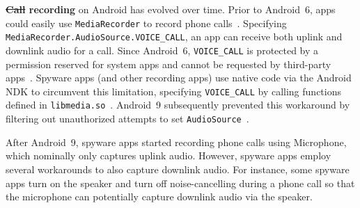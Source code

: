 \documentclass[sigconf,balance=false]{acmart}
\newcommand{\alex}[1]{\textcolor{chicagomaroon}{\noindent[AL: #1]}}
\newcommand{\geoff}[1]{\textcolor{purple}{\noindent[GV: #1]}}
\newcommand{\alex}[1]{}
\newcommand{\geoff}[1]{}
\providecommand{\DIFadd}[1]{{\protect\color{blue}\uwave{#1}}} %
\providecommand{\DIFdel}[1]{{\protect\color{red}\sout{#1}}}                      %
\providecommand{\DIFaddbegin}{} %
\providecommand{\DIFaddend}{} %
\providecommand{\DIFdelbegin}{} %
\providecommand{\DIFdelend}{} %
\newcommand{\DIFscaledelfig}{0.5}
\newlength{\DIFdelgraphicswidth} %
\newlength{\DIFdelgraphicsheight} %
\newcommand{\DIFaddincludegraphics}[2][]{{\color{blue}\fbox{\DIFOincludegraphics[#1]{#2}}}} %
\newcommand{\DIFdelincludegraphics}[2][]{%
\sbox{\DIFdelgraphicsbox}{\DIFOincludegraphics[#1]{#2}}%
\settoboxwidth{\DIFdelgraphicswidth}{\DIFdelgraphicsbox} %
\settoboxtotalheight{\DIFdelgraphicsheight}{\DIFdelgraphicsbox} %
\scalebox{\DIFscaledelfig}{%
\parbox[b]{\DIFdelgraphicswidth}{\usebox{\DIFdelgraphicsbox}\\[-\baselineskip] \rule{\DIFdelgraphicswidth}{0em}}\llap{\resizebox{\DIFdelgraphicswidth}{\DIFdelgraphicsheight}{%
\setlength{\unitlength}{\DIFdelgraphicswidth}%
\begin{picture}(1,1)%
\thicklines\linethickness{2pt} %
{\color[rgb]{1,0,0}\put(0,0){\framebox(1,1){}}}%
{\color[rgb]{1,0,0}\put(0,0){\line( 1,1){1}}}%
{\color[rgb]{1,0,0}\put(0,1){\line(1,-1){1}}}%
\end{picture}%
}\hspace*{3pt}}} %
} %
\DeclareRobustCommand{\DIFaddbegin}{\DIFOaddbegin \let\includegraphics\DIFaddincludegraphics} %
\DeclareRobustCommand{\DIFaddend}{\DIFOaddend \let\includegraphics\DIFOincludegraphics} %
\DeclareRobustCommand{\DIFdelbegin}{\DIFOdelbegin \let\includegraphics\DIFdelincludegraphics} %
\DeclareRobustCommand{\DIFdelend}{\DIFOaddend \let\includegraphics\DIFOincludegraphics} %
\begin{document}
\textbf{\DIFdelbegin \DIFdel{Call }\DIFdelend \DIFaddbegin \DIFadd{Phone call }\DIFaddend recording} on Android has evolved over time.
%
Prior to Android~6, apps could easily use \texttt{MediaRecorder} to
record phone calls~\cite{MediaRec53:online}.
Specifying \texttt{MediaRecorder.AudioSource.VOICE\_CALL},
an app can receive both uplink and downlink audio
for a call. Since Android~6, \texttt{VOICE\_CALL} is protected by a permission
reserved for system apps and cannot be requested by third-party
apps~\cite{VOICECAL55:online}. Spyware apps (and other recording apps) use
native code via the Android NDK to circumvent this limitation, specifying
\texttt{VOICE\_CALL} by calling functions defined in
\texttt{libmedia.so}~\cite{ViktorDe77:online}.
Android~9 subsequently prevented this workaround by filtering out
unauthorized attempts to set \texttt{AudioSource}~\cite{coplukAC3:online,
  services10:online}.

After Android~9, spyware apps started recording phone calls using
Microphone, which nominally only captures uplink audio.  However, spyware apps
employ several workarounds to also capture downlink audio.  For instance, some
spyware apps turn on the speaker and turn off noise-cancelling during a phone
call so that the microphone can potentially capture downlink audio via the
speaker.

\end{document}
